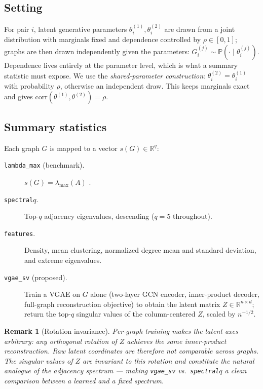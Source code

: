 \documentclass[11pt]{article}
\newtheorem{remark}{Remark}
\begin{document}
\subsection{Setting}

For pair $i$, latent generative parameters $\theta_i^{(1)}, \theta_i^{(2)}$ are
drawn from a joint distribution with marginals fixed and dependence controlled
by $\rho \in [0, 1]$; graphs are then drawn independently given the parameters:
$G_i^{(j)} \sim \mathbb{P}(\cdot \mid \theta_i^{(j)})$. Dependence lives
entirely at the parameter level, which is what a summary statistic must expose.
We use the \emph{shared-parameter construction}: $\theta_i^{(2)} =
\theta_i^{(1)}$ with probability $\rho$, otherwise an independent draw. This
keeps marginals exact and gives $\mathrm{corr}(\theta^{(1)}, \theta^{(2)}) =
\rho$.

\subsection{Summary statistics}

Each graph $G$ is mapped to a vector $s(G) \in \mathbb{R}^q$:

\begin{description}
  \item[\texttt{lambda\_max} (benchmark).] $s(G) = \lambda_{\max}(A)$
        \citep{fujita2017correlation}.
  \item[\texttt{spectral}$q$.] Top-$q$ adjacency eigenvalues, descending
        ($q = 5$ throughout).
  \item[\texttt{features}.] Density, mean clustering, normalized degree mean
        and standard deviation, and extreme eigenvalues.
  \item[\texttt{vgae\_sv} (proposed).] Train a VGAE \citep{kipf2016variational}
        on $G$ alone (two-layer GCN encoder, inner-product decoder, full-graph
        reconstruction objective) to obtain the latent matrix $Z \in
        \mathbb{R}^{n \times d}$; return the top-$q$ singular values of the
        column-centered $Z$, scaled by $n^{-1/2}$.
\end{description}

\begin{remark}[Rotation invariance]\label{rem:rotation}
Per-graph training makes the latent axes arbitrary: any orthogonal rotation of
$Z$ achieves the same inner-product reconstruction. Raw latent coordinates are
therefore not comparable across graphs. The singular values of $Z$ are
invariant to this rotation and constitute the natural analogue of the
adjacency spectrum --- making \texttt{vgae\_sv} vs.\ \texttt{spectral}$q$ a
clean comparison between a \emph{learned} and a \emph{fixed} spectrum.
\end{remark}
\end{document}

